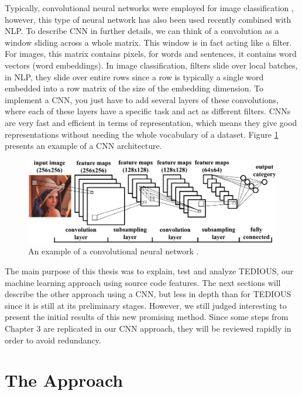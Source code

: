 Typically, convolutional neural networks were employed for image classification \citep{krizhevsky2012imagenet}, however, this type of neural network has also been used recently combined with NLP. To describe CNN in further details, we can think of a convolution as a window sliding across a whole matrix. This window is in fact acting like a filter. For images, this matrix contains pixels, for words and sentences, it contains word vectors (word embeddings). In image classification, filters slide over local batches, in NLP, they slide over entire rows since a row is typically a single word embedded into a row matrix of the size of the embedding dimension. To implement a CNN, you just have to add several layers of these convolutions, where each of these layers have a specific task and act as different filters. CNNs are very fast and efficient in terms of representation, which means they give good representations without needing the whole vocabulary of a dataset. Figure \ref{fig:example} presents an example of a CNN architecture.

\begin{figure}[t]
	\centering
	\includegraphics[width=\linewidth]{figs/CNN-example.png}
	\caption{An example of a convolutional neural network \citep{Cong2014MinimizingCI}.}
	\label{fig:example}
	\vspace{-4mm}
\end{figure}

The main purpose of this thesis was to explain, test and analyze TEDIOUS, our machine learning approach using source code features. The next sections will describe the other approach using a CNN, but less in depth than for TEDIOUS since it is still at its preliminary stages. However, we still judged interesting to present the initial results of this new promising method. Since some steps from Chapter 3 are replicated in our CNN approach, they will be reviewed rapidly in order to avoid redundancy.

\section{The Approach}

